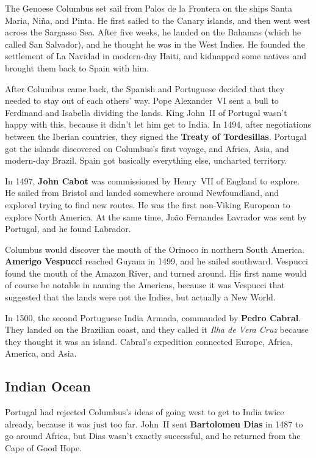 The Genoese Columbus set sail from Palos de la Frontera on the ships Santa Maria, Ni\~na, and Pinta.
He first sailed to the Canary islands, and then went west across the Sargasso Sea.
After five weeks, he landed on the Bahamas (which he called San Salvador),
and he thought he was in the West Indies.
He founded the settlement of La Navidad in modern-day Haiti,
and kidnapped some natives and brought them back to Spain with him.

After Columbus came back, the Spanish and Portuguese decided that they needed to stay out of each others' way.
Pope Alexander~VI sent a bull to Ferdinand and Isabella dividing the lands.
King John~II of Portugal wasn't happy with this, because it didn't let him get to India.
In 1494, after negotiations between the Iberian countries, they signed the \textbf{Treaty of Tordesillas}.
Portugal got the islands discovered on Columbus's first voyage, and Africa, Asia, and modern-day Brazil.
Spain got basically everything else, uncharted territory.

In 1497, \textbf{John Cabot} was commissioned by Henry~VII of England to explore.
He sailed from Bristol and landed somewhere around Newfoundland, and explored trying to find new routes.
He was the first non-Viking European to explore North America.
At the same time, Jo\~ao Fernandes Lavrador was sent by Portugal, and he found Labrador.

Columbus would discover the mouth of the Orinoco in northern South America.
\textbf{Amerigo Vespucci} reached Guyana in 1499, and he sailed southward.
Vespucci found the mouth of the Amazon River, and turned around.
His first name would of course be notable in naming the Americas,
because it was Vespucci that suggested that the lands were not the Indies, but actually a New World.

In 1500, the second Portuguese India Armada, commanded by \textbf{Pedro Cabral}.
They landed on the Brazilian coast,
and they called it \textit{Ilha de Vera Cruz} because they thought it was an island.
Cabral's expedition connected Europe, Africa, America, and Asia.

\subsection*{Indian Ocean}

Portugal had rejected Columbus's ideas of going west to get to India twice already,
because it was just too far.
John~II sent \textbf{Bartolomeu Dias} in 1487 to go around Africa,
but Dias wasn't exactly successful, and he returned from the Cape of Good Hope.

